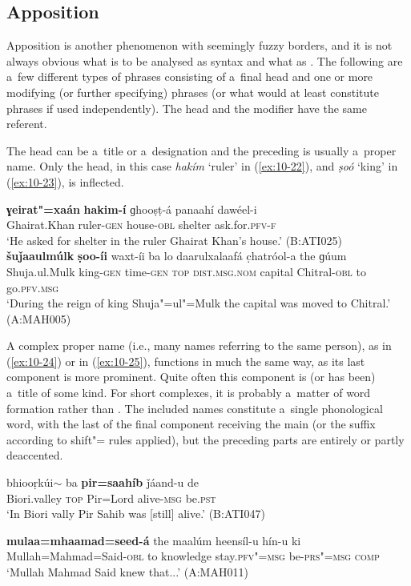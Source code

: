 \subsection{Apposition}
\label{subsec:10-1-3}

Apposition is another phenomenon with seemingly fuzzy borders, and it is not always obvious what is to be analysed as   syntax and what as  . The following are a~few different types of  phrases consisting of a~final  head and one or more modifying (or further specifying)  phrases (or what would at least constitute  phrases if used independently). The head and the modifier have the same referent.


The head can be a~title or a~designation and the preceding  is usually a~proper name. Only the head, in this case \textit{hakím} `ruler' in (\ref{ex:10-22}), and \textit{ṣoó} `king' in (\ref{ex:10-23}), is inflected.

\ea
\label{ex:10-22}
\gll \textbf{ɣeirat"=xaán} \textbf{hakim-í} ɡhooṣṭ-á panaahí dawéel-i \\
Ghairat.Khan ruler-\textsc{gen} house-\textsc{obl} shelter ask.for.\textsc{pfv-f} \\
\glt `He asked for shelter in the ruler Ghairat Khan's house.' (B:ATI025)
\ex
\label{ex:10-23}
\gll \textbf{šuǰaaulmúlk} \textbf{ṣoo-íi} waxt-íi ba lo daarulxalaafá c̣hatróol-a the ɡúum \\
Shuja.ul.Mulk king-\textsc{gen} time-\textsc{gen} \textsc{top} \textsc{dist.msg.nom}  capital Chitral-\textsc{obl} to go.\textsc{pfv.msg}  \\
\glt `During the reign of king Shuja"=ul"=Mulk the capital was moved to Chitral.' (A:MAH005)
\z

A complex proper name (i.e., many names referring to the same person), as in (\ref{ex:10-24}) or in (\ref{ex:10-25}), functions in much the same way, as its last component is more prominent. Quite often this component is (or has been) a~title of some kind. For short complexes, it is probably a~matter of word formation rather than . The included names constitute a~single phonological word, with the last  of the final component receiving the main  (or the suffix according to shift"= rules applied), but the preceding parts are entirely or partly deaccented.

\begin{exe}
\ex
\label{ex:10-24}
\gll bhiooṛkúi$\sim$ ba \textbf{pir=saahíb} ǰáand-u de\\
Biori.valley \textsc{top} Pir=Lord alive-\textsc{msg} be.\textsc{pst}\\
\glt `In Biori vally Pir Sahib was [still] alive.' (B:ATI047)

\ex
\label{ex:10-25}
\gll \textbf{mulaa=mhaamad=seed-á} the maalúm heensíl-u hín-u ki\\
Mullah=Mahmad=Said-\textsc{obl} to knowledge stay.\textsc{pfv"=msg} be-\textsc{prs"=msg} \textsc{comp}\\
\glt `Mullah Mahmad Said knew that...' (A:MAH011)
\end{exe}

